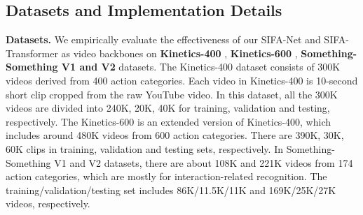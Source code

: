 \documentclass[10pt,twocolumn,letterpaper]{article}
\begin{document}
\subsection{Datasets and Implementation Details}
\textbf{Datasets.} We empirically evaluate the effectiveness of our SIFA-Net and SIFA-Transformer as video backbones on \textbf{Kinetics-400} \cite{Carreira:CVPR17}, \textbf{Kinetics-600} \cite{Kinetics:600}, \textbf{Something-Something V1 and V2} \cite{Goyal:SS} datasets.
The Kinetics-400 dataset consists of 300K videos derived from 400 action categories. Each video in Kinetics-400 is 10-second short clip cropped from the raw YouTube video.
In this dataset, all the 300K videos are divided into 240K, 20K, 40K for training, validation and testing, respectively.
The Kinetics-600 is an extended version of Kinetics-400, which includes around 480K videos from 600 action categories.
There are 390K, 30K, 60K clips in training, validation and testing sets, respectively.
In Something-Something V1 and V2 datasets, there are about 108K and 221K videos from 174 action categories, which are mostly for interaction-related recognition.
The training/validation/testing set includes 86K/11.5K/11K and 169K/25K/27K videos, respectively.
\end{document}
